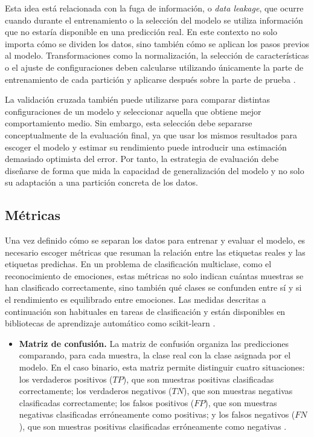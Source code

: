 Esta idea está relacionada con la fuga de información, o \textit{data leakage}, que ocurre cuando durante el entrenamiento o la selección del modelo se utiliza información que no estaría disponible en una predicción real. En este contexto no solo importa cómo se dividen los datos, sino también cómo se aplican los pasos previos al modelo. Transformaciones como la normalización, la selección de características o el ajuste de configuraciones deben calcularse utilizando únicamente la parte de entrenamiento de cada partición y aplicarse después sobre la parte de prueba \cite{kaufman2012leakage}.


La validación cruzada también puede utilizarse para comparar distintas configuraciones de un modelo y seleccionar aquella que obtiene mejor comportamiento medio. Sin embargo, esta selección debe separarse conceptualmente de la evaluación final, ya que usar los mismos resultados para escoger el modelo y estimar su rendimiento puede introducir una estimación demasiado optimista del error. Por tanto, la estrategia de evaluación debe diseñarse de forma que mida la capacidad de generalización del modelo y no solo su adaptación a una partición concreta de los datos.

\subsection{Métricas}

Una vez definido cómo se separan los datos para entrenar y evaluar el modelo, es necesario escoger métricas que resuman la relación entre las etiquetas reales y las etiquetas predichas. En un problema de clasificación multiclase, como el reconocimiento de emociones, estas métricas no solo indican cuántas muestras se han clasificado correctamente, sino también qué clases se confunden entre sí y si el rendimiento es equilibrado entre emociones. Las medidas descritas a continuación son habituales en tareas de clasificación y están disponibles en bibliotecas de aprendizaje automático como scikit-learn \cite{sklearnMetrics}.

\begin{itemize}
    \item \textbf{Matriz de confusión.} La matriz de confusión organiza las predicciones comparando, para cada muestra, la clase real con la clase asignada por el modelo. En el caso binario, esta matriz permite distinguir cuatro situaciones: los verdaderos positivos (\(TP\)), que son muestras positivas clasificadas correctamente; los verdaderos negativos (\(TN\)), que son muestras negativas clasificadas correctamente; los falsos positivos (\(FP\)), que son muestras negativas clasificadas erróneamente como positivas; y los falsos negativos (\(FN\)), que son muestras positivas clasificadas erróneamente como negativas \cite{benhay2018confusionMatrix}.
\end{itemize}

